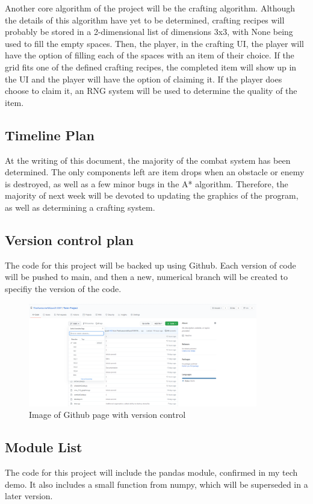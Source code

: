 \documentclass[12pt]{article}
\begin{document}
Another core algorithm of the project will be the crafting algorithm.
Although the details of this algorithm have yet to be determined, 
crafting recipes will probably be stored in a 2-dimensional list of 
dimensions 3x3, with None being used to fill the empty spaces. Then, the player, 
in the crafting UI, the player will have the option of filling each of 
the spaces with an item of their choice. If the grid fits one of the
defined crafting recipes, the completed item will show up in the UI
and the player will have the option of claiming it. If the player
does choose to claim it, an RNG system will be used to determine the quality
of the item. 

\subsection{Timeline Plan}
At the writing of this document, the majority of the combat system has 
been determined. The only components left are item drops when an obstacle
or enemy is destroyed, as well as a few minor bugs in the A* algorithm.
Therefore, the majority of next week will be devoted to updating the 
graphics of the program, as well as determining a crafting system. 

\subsection{Version control plan}
The code for this project will be backed up using Github. Each version
of code will be pushed to main, and then a new, numerical branch will
be created to specifiy the version of the code. 

\begin{figure}[h]
    \centering
    \includegraphics[width = 10cm]{Capture}
    \caption{Image of Github page with version control}
\end{figure}

\subsection{Module List}
The code for this project will include the pandas module, confirmed in 
my tech demo. It also includes a small function from numpy, which will
be superseded in a later version. 
\newpage
\end{document}
